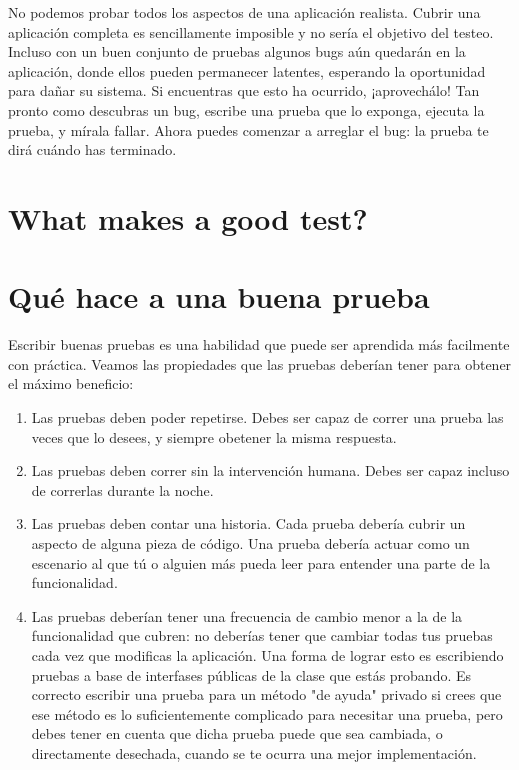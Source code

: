 \documentclass[a4paper,10pt,twoside]{book}
\begin{document}
No podemos probar todos los aspectos de una aplicación realista.
Cubrir una aplicación completa es sencillamente imposible y no sería el objetivo del testeo.
Incluso con un buen conjunto de pruebas
algunos bugs aún quedarán en la aplicación, donde ellos pueden permanecer latentes, esperando la oportunidad para dañar su sistema.
Si encuentras que esto ha ocurrido, ¡aprovechálo!
Tan pronto como descubras un bug, escribe una prueba que lo exponga, ejecuta la prueba, y mírala fallar.
Ahora puedes comenzar a arreglar el bug: la prueba te dirá cuándo has terminado.
\section{What makes a good test?}
\section{Qué hace a una buena prueba}

Escribir buenas pruebas es una habilidad que puede ser aprendida más facilmente con práctica.
Veamos las propiedades que las pruebas deberían tener para obtener el máximo beneficio: 


\begin{enumerate}

\item Las pruebas deben poder repetirse. Debes ser capaz de correr una prueba
	las  veces que lo desees, y siempre obetener la misma respuesta.

\item Las pruebas deben correr sin la intervención humana. Debes ser capaz
	incluso de correrlas durante la noche.

\item Las pruebas deben contar una historia. Cada prueba debería cubrir un aspecto
	de alguna pieza de código. Una prueba debería actuar como un escenario al que tú o alguien más
	pueda leer para entender una parte de la funcionalidad. \label{prop:oneAspect}

\item Las pruebas deberían tener una frecuencia de cambio menor
	a la de la funcionalidad que cubren: no deberías tener que cambiar
	todas tus pruebas cada vez que modificas la aplicación.  Una forma de lograr
	esto es escribiendo pruebas a base de interfases públicas de la clase que
	estás probando.      
	Es correcto escribir una prueba para un método "de ayuda" privado si crees que 
	ese método es lo suficientemente complicado para necesitar una prueba, pero debes
	tener en cuenta que dicha prueba puede que sea cambiada, o directamente desechada,
	cuando se te ocurra una mejor implementación.
\end{enumerate}
\end{document}
